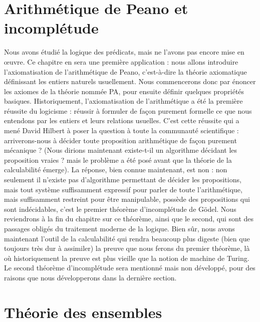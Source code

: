 



\chapter{Arithmétique de Peano et incomplétude}

Nous avons étudié la logique des prédicats, mais ne l'avons pas encore mise en \oe uvre. Ce chapitre en sera une première application : nous allons introduire l'axiomatisation de l'arithmétique de Peano, c'est-à-dire la théorie axiomatique définissant les entiers naturels usuellement. Nous commencerons donc par énoncer les axiomes de la théorie nommée PA, pour ensuite définir quelques propriétés basiques. Historiquement, l'axiomatisation de l'arithmétique a été la première réussite du logicisme : réussir à formuler de façon purement formelle ce que nous entendons par les entiers et leurs relations usuelles. C'est cette réussite qui a mené David Hilbert à poser la question à toute la communauté scientifique : \og arriverons-nous à décider toute proposition arithmétique de façon purement mécanique ?\fg{} (Nous dirions maintenant \og existe-t-il un algorithme décidant les proposition vraies ?\fg{} mais le problème a été posé avant que la théorie de la calculabilité émerge). La réponse, bien connue maintenant, est non : non seulement il n'existe pas d'algorithme permettant de décider les propositions, mais tout système suffisamment expressif pour parler de toute l'arithmétique, mais suffisamment restreint pour être manipulable, possède des propositions qui sont indécidables, c'est le premier théorème d'incomplétude de Gödel. Nous reviendrons à la fin du chapitre sur ce théorème, ainsi que le second, qui sont des passages obligés du traitement moderne de la logique. Bien sûr, nous avons maintenant l'outil de la calculabilité qui rendra beaucoup plus digeste (bien que toujours très dur à assimiler) la preuve que nous ferons du premier théorème, là où historiquement la preuve est plus vieille que la notion de machine de Turing. Le second théorème d'incomplétude sera mentionné mais non développé, pour des raisons que nous développerons dans la dernière section.





\chapter{Théorie des ensembles}

